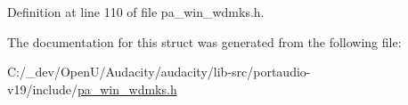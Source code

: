 Definition at line 110 of file pa\+\_\+win\+\_\+wdmks.\+h.



The documentation for this struct was generated from the following file\+:\begin{DoxyCompactItemize}
\item 
C\+:/\+\_\+dev/\+Open\+U/\+Audacity/audacity/lib-\/src/portaudio-\/v19/include/\hyperlink{pa__win__wdmks_8h}{pa\+\_\+win\+\_\+wdmks.\+h}\end{DoxyCompactItemize}

